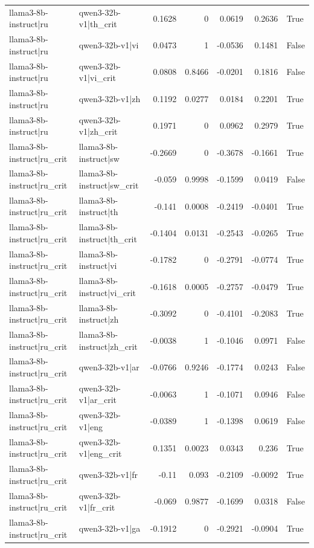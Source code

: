 \begin{table}
\begin{tabular}{l l r r r r l}
llama3-8b-instruct|ru & qwen3-32b-v1|th_crit & 0.1628 & 0 & 0.0619 & 0.2636 & True \\
llama3-8b-instruct|ru & qwen3-32b-v1|vi & 0.0473 & 1 & -0.0536 & 0.1481 & False \\
llama3-8b-instruct|ru & qwen3-32b-v1|vi_crit & 0.0808 & 0.8466 & -0.0201 & 0.1816 & False \\
llama3-8b-instruct|ru & qwen3-32b-v1|zh & 0.1192 & 0.0277 & 0.0184 & 0.2201 & True \\
llama3-8b-instruct|ru & qwen3-32b-v1|zh_crit & 0.1971 & 0 & 0.0962 & 0.2979 & True \\
llama3-8b-instruct|ru_crit & llama3-8b-instruct|sw & -0.2669 & 0 & -0.3678 & -0.1661 & True \\
llama3-8b-instruct|ru_crit & llama3-8b-instruct|sw_crit & -0.059 & 0.9998 & -0.1599 & 0.0419 & False \\
llama3-8b-instruct|ru_crit & llama3-8b-instruct|th & -0.141 & 0.0008 & -0.2419 & -0.0401 & True \\
llama3-8b-instruct|ru_crit & llama3-8b-instruct|th_crit & -0.1404 & 0.0131 & -0.2543 & -0.0265 & True \\
llama3-8b-instruct|ru_crit & llama3-8b-instruct|vi & -0.1782 & 0 & -0.2791 & -0.0774 & True \\
llama3-8b-instruct|ru_crit & llama3-8b-instruct|vi_crit & -0.1618 & 0.0005 & -0.2757 & -0.0479 & True \\
llama3-8b-instruct|ru_crit & llama3-8b-instruct|zh & -0.3092 & 0 & -0.4101 & -0.2083 & True \\
llama3-8b-instruct|ru_crit & llama3-8b-instruct|zh_crit & -0.0038 & 1 & -0.1046 & 0.0971 & False \\
llama3-8b-instruct|ru_crit & qwen3-32b-v1|ar & -0.0766 & 0.9246 & -0.1774 & 0.0243 & False \\
llama3-8b-instruct|ru_crit & qwen3-32b-v1|ar_crit & -0.0063 & 1 & -0.1071 & 0.0946 & False \\
llama3-8b-instruct|ru_crit & qwen3-32b-v1|eng & -0.0389 & 1 & -0.1398 & 0.0619 & False \\
llama3-8b-instruct|ru_crit & qwen3-32b-v1|eng_crit & 0.1351 & 0.0023 & 0.0343 & 0.236 & True \\
llama3-8b-instruct|ru_crit & qwen3-32b-v1|fr & -0.11 & 0.093 & -0.2109 & -0.0092 & True \\
llama3-8b-instruct|ru_crit & qwen3-32b-v1|fr_crit & -0.069 & 0.9877 & -0.1699 & 0.0318 & False \\
llama3-8b-instruct|ru_crit & qwen3-32b-v1|ga & -0.1912 & 0 & -0.2921 & -0.0904 & True \\

\end{tabular}
\end{table}
